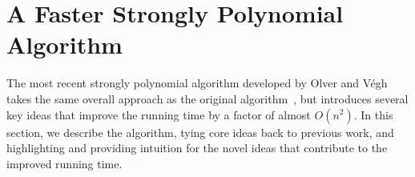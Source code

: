 \documentclass[11pt]{article}
\theoremstyle{definition}
\theoremstyle{definition}
\theoremstyle{definition}
\newcommand{\tf}{\textsc{Tight-Flow}}
\newcommand{\filtration}{\textsc{Filtration}}
\renewcommand{\todo}[1]{\hl{TODO: #1}}
\begin{document}
	
    
	


\section{A Faster Strongly Polynomial Algorithm}\label{sec:2017}

The most recent strongly polynomial algorithm developed by Olver and Végh \cite{Olver2017} takes the same overall approach as the original algorithm~\cite{Vegh2013}, but introduces several key ideas that improve the running time by a factor of almost $O(n^2)$. 
In this section, we describe the algorithm, tying core ideas back to previous work, and highlighting and providing intuition for the novel ideas that contribute to the improved running time. 
\end{document}

